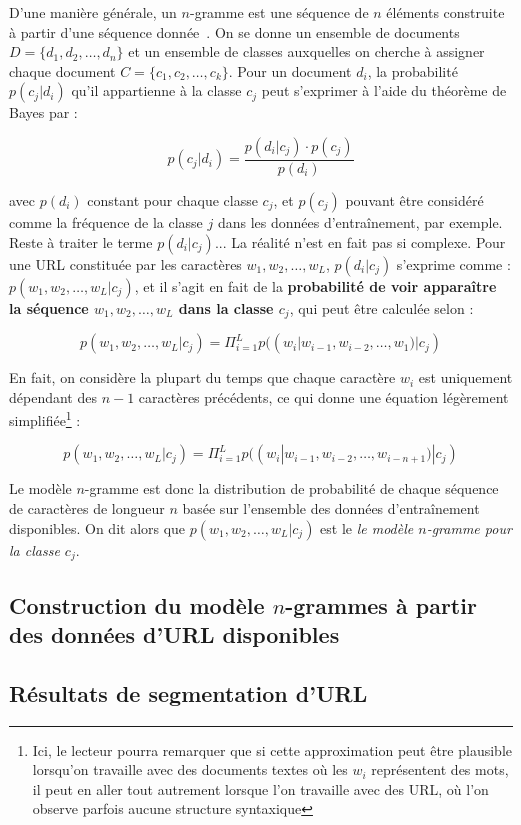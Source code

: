 \documentclass[11pt, a4paper]{article}
\begin{document}
D'une manière générale, un $n$-gramme est une séquence de $n$ éléments construite à partir d'une séquence donnée~\cite{abdallah}. On se donne un ensemble de documents $D = \{d_1, d_2, \dots, d_n\}$ et un ensemble de classes auxquelles on cherche à assigner chaque document $C = \{c_1, c_2, \dots, c_k\}$. Pour un document $d_i$, la probabilité $p(c_j|d_i)$ qu'il appartienne à la classe $c_j$ peut s'exprimer à l'aide du théorème de Bayes par :

\[
p(c_j|d_i) = \frac{p(d_i|c_j) \cdot p(c_j)}{p(d_i)}
\]

avec $p(d_i)$ constant pour chaque classe $c_j$, et $p(c_j)$ pouvant être considéré comme la fréquence de la classe $j$ dans les données d'entraînement, par exemple. Reste à traiter le terme $p(d_i|c_j)$... La réalité n'est en fait pas si complexe. Pour une URL constituée par les caractères $w_1, w_2, \dots, w_L$, $p(d_i|c_j)$ s'exprime comme : $p(w_1, w_2, \dots, w_L|c_j)$, et il s'agit en fait de la \textbf{probabilité de voir apparaître la séquence $w_1, w_2, \dots, w_L$ dans la classe $c_j$}, qui peut être calculée selon :

\[
p(w_1, w_2, \dots, w_L|c_j) = \Pi_{i=1}^{L}p((w_i|w_{i-1}, w_{i-2}, \dots, w_1)|c_j)
\]

En fait, on considère la plupart du temps que chaque caractère $w_i$ est uniquement dépendant des $n-1$ caractères précédents, ce qui donne une équation légèrement simplifiée\footnote{Ici, le lecteur pourra remarquer que si cette approximation peut être plausible lorsqu'on travaille avec des documents textes où les $w_i$ représentent des mots, il peut en aller tout autrement lorsque l'on travaille avec des URL, où l'on observe parfois aucune structure syntaxique} :

\[
p(w_1, w_2, \dots, w_L|c_j) = \Pi_{i=1}^{L}p((w_i|w_{i-1}, w_{i-2}, \dots, w_{i-n+1})|c_j)
\]

Le modèle $n$-gramme est donc la distribution de probabilité de chaque séquence de caractères de longueur $n$ basée sur l'ensemble des données d'entraînement disponibles. On dit alors que $p(w_1, w_2, \dots, w_L|c_j)$ est le \textit{le modèle $n$-gramme pour la classe $c_j$}.

\subsection{Construction du modèle $n$-grammes à partir des données d'URL disponibles}

\subsection{Résultats de segmentation d'URL}

\newpage
{}


\end{document}
